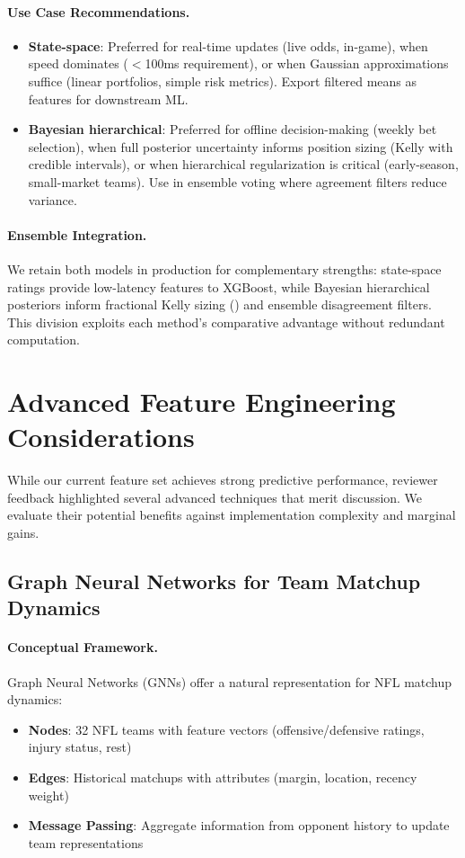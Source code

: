 \paragraph{Use Case Recommendations.}
\begin{itemize}
  \item \textbf{State-space}: Preferred for real-time updates (live odds, in-game), when speed dominates ($<$100ms requirement), or when Gaussian approximations suffice (linear portfolios, simple risk metrics). Export filtered means as features for downstream ML.
  \item \textbf{Bayesian hierarchical}: Preferred for offline decision-making (weekly bet selection), when full posterior uncertainty informs position sizing (Kelly with credible intervals), or when hierarchical regularization is critical (early-season, small-market teams). Use in ensemble voting where agreement filters reduce variance.
\end{itemize}

\paragraph{Ensemble Integration.}
We retain both models in production for complementary strengths: state-space ratings provide low-latency features to XGBoost, while Bayesian hierarchical posteriors inform fractional Kelly sizing () and ensemble disagreement filters. This division exploits each method's comparative advantage without redundant computation.

\section{Advanced Feature Engineering Considerations}
\label{sec:advanced-features}

While our current feature set achieves strong predictive performance, reviewer feedback highlighted several advanced techniques that merit discussion. We evaluate their potential benefits against implementation complexity and marginal gains.

\subsection{Graph Neural Networks for Team Matchup Dynamics}

\paragraph{Conceptual Framework.}
Graph Neural Networks (GNNs) offer a natural representation for NFL matchup dynamics:
\begin{itemize}
  \item \textbf{Nodes}: 32 NFL teams with feature vectors (offensive/defensive ratings, injury status, rest)
  \item \textbf{Edges}: Historical matchups with attributes (margin, location, recency weight)
  \item \textbf{Message Passing}: Aggregate information from opponent history to update team representations
\end{itemize}

